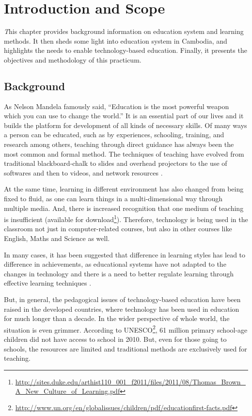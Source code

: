 \chapter{Introduction and Scope}

\epigraph{\emph This chapter provides background information on education system and learning methods. It then sheds some light into education system in Cambodia, and highlights the needs to enable technology-based education. Finally, it presents the objectives and methodology of this practicum.}{}

\newpage




\section{Background}


As Nelson Mandela famously said, “Education is the most powerful weapon which you can use to change the world.” It is an essential part of our lives and it builds the platform for development of all kinds of necessary skills. Of many ways a person can be educated, such as by experiences, schooling, training, and research among others, teaching through direct guidance has always been the most common and formal method. The techniques of teaching have evolved from traditional blackboard-chalk to slides and overhead projectors to the use of softwares and then to videos, and network resources \citep{DELCAMPO2012TRA}.


At the same time, learning in different environment has also changed from being fixed to fluid, as one can learn things in a multi-dimensional way through multiple media. And, there is increased recognition that one medium of teaching is insufficient \citep{ref701470815} (available for download\footnote{\url{http://sites.duke.edu/arthist110_001_f2011/files/2011/08/Thomas_Brown_A_New_Culture_of_Learning.pdf}}). Therefore, technology is being used in the classroom not just in computer-related courses, but also in other courses like English, Maths and Science as well.  


In many cases, it has been suggested that difference in learning styles has lead to difference in achievements, as educational systems have not adapted to the changes in technology and there is a need to better regulate learning through effective learning techniques \citep{dunlosky2013improving}.


But, in general, the pedagogical issues of technology-based education have been raised in the developed countries, where technology has been used in education for much longer than a decade. In the wider perspective of whole world, the situation is even grimmer. According to UNESCO\footnote{\url{http://www.un.org/en/globalissues/children/pdf/educationfirst-facts.pdf}}, 61 million primary school-age children did not have access to school in 2010. But, even for those going to schools, the resources are limited and traditional methods are exclusively used for teaching. 

